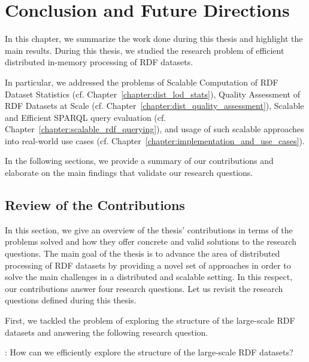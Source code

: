 \chapter{Conclusion and Future Directions}
\label{chapter:conclusion}

In this chapter, we summarize the work done during this thesis and highlight the main results.
During this thesis, we studied the research problem of efficient distributed in-memory processing of \gls{RDF} datasets.

In particular, we addressed the problems of Scalable Computation of \gls{RDF} Dataset Statistics (cf. Chapter~\ref{chapter:dist_lod_stats}), Quality Assessment of \gls{RDF} Datasets at Scale (cf. Chapter~\ref{chapter:dist_quality_assessment}), Scalable and Efficient \gls{SPARQL} query evaluation (cf. Chapter~\ref{chapter:scalable_rdf_querying}), and usage of such scalable approaches into real-world use cases (cf. Chapter~\ref{chapter:implementation_and_use_cases}).

In the following sections, we provide a summary of our contributions and elaborate on the main findings that validate our research questions.

\section{Review of the Contributions}
In this section, we give an overview of the thesis' contributions in terms of the problems solved and how they offer concrete and valid solutions to the research questions.
The main goal of the thesis is to advance the area of distributed processing of \gls{RDF} datasets by providing a novel set of approaches in order to solve the main challenges in a distributed and scalable setting.
In this respect, our contributions answer four research questions.
Let us revisit the research questions defined during this thesis.

First, we tackled the problem of exploring the structure of the large-scale \gls{RDF} datasets and answering the following research question.

\begin{tcolorbox}
\textbf{\rqNr[RQ1]\label{rqc:1}}: How can we efficiently explore the structure of the large-scale \gls{RDF} datasets?
\end{tcolorbox}

